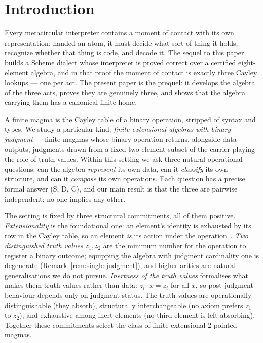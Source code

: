 \documentclass[sigconf,screen]{acmart}
\newcommand{\dotop}{\cdot}
\theoremstyle{remark}
\begin{document}
\maketitle

\section{Introduction}
\label{sec:introduction}

Every metacircular interpreter contains a moment of contact with its
own representation: handed an atom, it must decide what sort of thing
it holds, recognize whether that thing is code, and decode it. The
sequel to this paper~\cite{companion-pearl} builds a Scheme dialect
whose interpreter is proved correct over a certified eight-element
algebra, and in that proof the moment of contact is exactly three
Cayley lookups --- one per act. The present paper is the prequel: it
develops the algebra of the three acts, proves they are genuinely
three, and shows that the algebra carrying them has a canonical
finite home.

A finite magma is the Cayley table of a binary operation, stripped of
syntax and types. We study a particular kind: \emph{finite extensional
algebras with binary judgment} --- finite magmas whose binary operation
returns, alongside data outputs, judgments drawn from a fixed two-element
subset of the carrier playing the role of truth values. Within this
setting we ask three natural operational questions: can the algebra
\emph{represent} its own data, can it \emph{classify} its own structure,
and can it \emph{compose} its own operations. Each question has a precise
formal answer (S, D, C), and our main result is that the three are
pairwise independent: no one implies any other.

The setting is fixed by three structural commitments, all of them positive.
\emph{Extensionality} is the foundational one: an element's identity is
exhausted by its row in the Cayley table, so an element \emph{is} its
action under the operation~\cite{burris81}. \emph{Two distinguished
truth values} $z_1, z_2$ are the minimum number for the operation to
register a binary outcome; equipping the algebra with judgment cardinality
one is degenerate (Remark~\ref{rem:single-judgment}), and higher arities
are natural generalisations we do not pursue. \emph{Inertness of the
truth values} formalises what makes them truth values rather than data:
$z_i \dotop x = z_i$ for all $x$, so post-judgment behaviour depends only
on judgment status. The truth values are operationally distinguishable
(they absorb), structurally interchangeable (no axiom prefers $z_1$ to
$z_2$), and exhaustive among inert elements (no third element is
left-absorbing). Together these commitments select the class of finite
extensional 2-pointed magmas.
\end{document}
